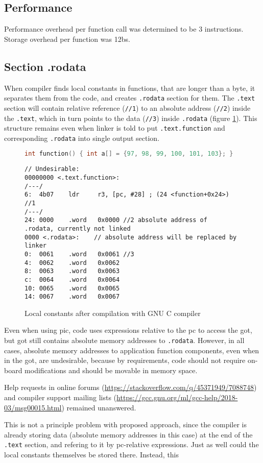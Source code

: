 \subsection{Performance}

Performance overhead per function call was determined to be 3 instructions. Storage overhead per function was 12\glspl{b}. 


\subsection{Section .rodata}\label{rodata}

When compiler finds local constants in functions, that are longer than a byte, it separates them from the code, and creates \texttt{.rodata} section for them. The \texttt{.text}
section will contain relative reference (\texttt{//1}) to an absolute address (\texttt{//2}) inside the \texttt{.text}, which in turn points to the data (\texttt{//3}) inside \texttt{.rodata} (figure \ref{fig:rodata}). This structure remains even when linker is told to put \texttt{.text.function} and corresponding \texttt{.rodata} into single output section.

\begin{figure} [htb]
\begin{lstlisting}[language=C]
int function() { int a[] = {97, 98, 99, 100, 101, 103}; }
\end{lstlisting}
\begin{lstlisting}[style=asm]
// Undesirable:
00000000 <.text.function>:
/---/
6:  4b07    ldr     r3, [pc, #28] ; (24 <function+0x24>) //1
/---/
24: 0000    .word   0x0000 //2 absolute address of
.rodata, currently not linked
0000 <.rodata>:    // absolute address will be replaced by linker
0:  0061    .word   0x0061 //3
4:  0062    .word   0x0062
8:  0063    .word   0x0063
c:  0064    .word   0x0064
10: 0065    .word   0x0065
14: 0067    .word   0x0067
\end{lstlisting}
\caption{Local constants after compilation with GNU C compiler}
\label{fig:rodata}
\end{figure}

Even when using \gls{pic}, code uses expressions relative to the \gls{pc} to access the \gls{got}, but \gls{got} still contains absolute memory addresses to \texttt{.rodata}. However, in all cases, absolute memory addresses to application function components, even when in the \gls{got}, are undesirable, because by requirements, code should not require on-board modifications and should be movable in memory space.

Help requests in online forums (\url{https://stackoverflow.com/q/45371949/7088748}) and compiler support mailing lists (\url{https://gcc.gnu.org/ml/gcc-help/2018-03/msg00015.html}) remained unanswered.

This is not a principle problem with proposed approach, since the compiler is already storing data (absolute memory addresses in this case) at the end of the \texttt{.text} section, and refering to it by \gls{pc}-relative expressions. Just as well could the local constants themselves be stored there. Instead, this 